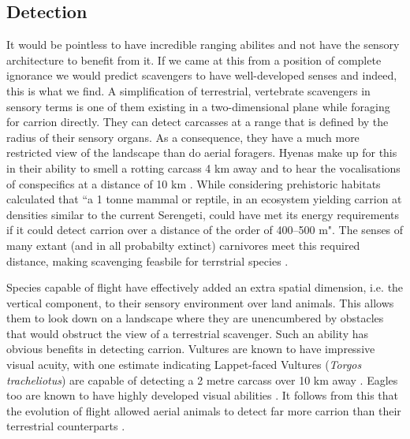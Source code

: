 \documentclass[a4paper,12pt]{article}
\begin{document}
\subsection*{Detection}
It would be pointless to have incredible ranging abilites and not have the sensory architecture to benefit from it.
If we came at this from a position of complete ignorance we would predict scavengers to have well-developed senses and indeed, this is what we find. 
A simplification of terrestrial, vertebrate scavengers in sensory terms is one of them existing in a two-dimensional plane while foraging for carrion directly.
They can detect carcasses at a range that is defined by the radius of their sensory organs. %
As a consequence, they have a much more restricted view of the landscape than do aerial foragers.
Hyenas make up for this in their ability to smell a rotting carcass 4 km away and to hear the vocalisations of conspecifics at a distance of 10 km \citep{mills1989comparative}. 
While considering prehistoric habitats \cite{ruxton2004obligate} calculated that ``a 1 tonne mammal or reptile, in an ecosystem yielding carrion at densities similar to the current Serengeti, could have met its energy requirements if it could detect carrion over a distance of the order of 400–500 m".
The senses of many extant (and in all probabilty extinct) carnivores meet this required distance, making scavenging feasbile for terrstrial species \citep{farlow1994speculations,mech2010wolves}. 

Species capable of flight have effectively added an extra spatial dimension, i.e. the vertical component, to their sensory environment over land animals.
This allows them to look down on a landscape where they are unencumbered by obstacles that would obstruct the view of a terrestrial scavenger.
Such an ability has obvious benefits in detecting carrion.
Vultures are known to have impressive visual acuity, with one estimate indicating Lappet-faced Vultures (\textit{Torgos tracheliotus}) are capable of detecting a 2 metre carcass over 10 km away \citep{spiegel2013factors}.
Eagles too are known to have highly developed visual abilities \citep{reymond1985spatial}.
It follows from this that the evolution of flight allowed aerial animals to detect far more carrion than their terrestrial counterparts \citep{AR:AR22815}.
\end{document}
